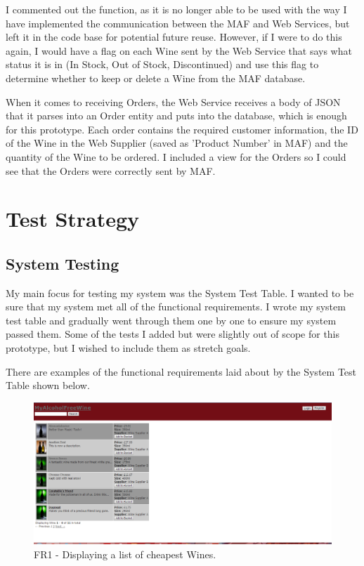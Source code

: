 \documentclass[12pt]{article}
\begin{document}
I commented out the function, as it is no longer able to be used with the way I have implemented the communication between the MAF and Web Services, but left it in the code base for potential future reuse. However, if I were to do this again, I would have a flag on each Wine sent by the Web Service that says what status it is in (In Stock, Out of Stock, Discontinued) and use this flag to determine whether to keep or delete a Wine from the MAF database.

When it comes to receiving Orders, the Web Service receives a body of JSON that it parses into an Order entity and puts into the database, which is enough for this prototype. Each order contains the required customer information, the ID of the Wine in the Web Supplier (saved as 'Product Number' in MAF) and the quantity of the Wine to be ordered. I included a view for the Orders so I could see that the Orders were correctly sent by MAF.



\section{Test Strategy}
\subsection{System Testing}
My main focus for testing my system was the System Test Table. I wanted to be sure that my system met all of the functional requirements. I wrote my system test table and gradually went through them one by one to ensure my system passed them. Some of the tests I added but were slightly out of scope for this prototype, but I wished to include them as stretch goals.

There are examples of the functional requirements laid about by the System Test Table shown below.

\begin{figure}[H]
        \centering
                \includegraphics[width=1\textwidth]{assets/FR1_screen_1}
                \caption{FR1 - Displaying a list of cheapest Wines.}
                \label{fig: FR1_1.} 
\end{figure}
\end{document}
